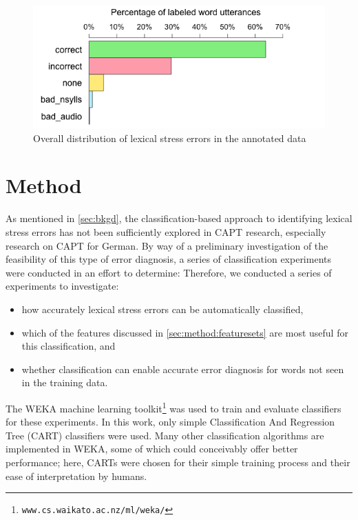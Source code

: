 \documentclass[a4paper]{article}
\newcommand{\TODO}[1]{{\color{red}\textbf{[TODO #1]}}}
\begin{document}
		\begin{figure}
			\centering
			\includegraphics[width=\columnwidth]{overallJudgments-axisTop-noLabels}
			\caption{Overall distribution of lexical stress errors in the annotated data}
			\label{fig:errors}
		\end{figure}
	
	
	
	
	\section{Method}
	\label{sec:method}
	
	As mentioned in \cref{sec:bkgd}, the classification-based approach to identifying lexical stress errors has not been sufficiently explored in CAPT research, especially research on CAPT for German. 
	By way of a preliminary investigation of the feasibility of this type of error diagnosis, a series of classification experiments were conducted in an effort to determine:
	Therefore, we conducted a series of experiments to investigate:
	\begin{itemize}%
	 \item{how accurately lexical stress errors can be automatically classified, 
	 }
	 \item{which of the features discussed in \cref{sec:method:featuresets} are most useful for this classification, and}
	 \item{whether classification can enable accurate error diagnosis for words 
	 not seen in the training data.}
	 \end{itemize}
	
	 
	 The WEKA machine learning toolkit\footnote{\texttt{www.cs.waikato.ac.nz/ml/weka/}} was used to train and evaluate classifiers for these experiments. In this work, only simple Classification And Regression Tree (CART) classifiers %
	 were used.
	 Many other classification algorithms are implemented in WEKA, some of which could  conceivably offer better performance; here, CARTs were chosen for their simple training process and their ease of interpretation by humans. 
\end{document}
